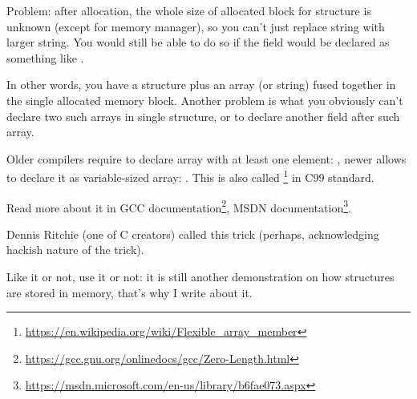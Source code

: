 Problem: after allocation, the whole size of allocated block for structure is unknown (except for memory manager),
so you can't just replace string with larger string.
You would still be able to do so if the field would be declared as something like .

In other words, you have a structure plus an array (or string) fused together in the single allocated memory block.
Another problem is what you obviously can't declare two such arrays in single structure, or to declare another field
after such array.

Older compilers require to declare array with at least one element: , newer allows to declare it as variable-sized
array: .
This is also called \footnote{\url{https://en.wikipedia.org/wiki/Flexible_array_member}}
in C99 standard.

Read more about it in
GCC documentation\footnote{\url{https://gcc.gnu.org/onlinedocs/gcc/Zero-Length.html}},
MSDN documentation\footnote{\url{https://msdn.microsoft.com/en-us/library/b6fae073.aspx}}.

Dennis Ritchie (one of C creators) called this trick  
(perhaps, acknowledging hackish nature of the trick).

Like it or not, use it or not:
it is still another demonstration on how structures are stored in memory, that's why I write about it.

